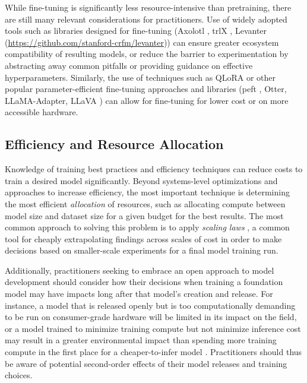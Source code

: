 While fine-tuning is significantly less resource-intensive than pretraining, there are still many relevant considerations for practitioners. Use of widely adopted tools such as libraries designed for fine-tuning (Axolotl \citep{axolotl}, trlX \citep{trlx-library}, Levanter (\url{https://github.com/stanford-crfm/levanter})) can ensure greater ecosystem compatibility of resulting models, or reduce the barrier to experimentation by abstracting away common pitfalls or providing guidance on effective hyperparameters. Similarly, the use of techniques such as QLoRA \citep{dettmers2023qlora} or other popular parameter-efficient fine-tuning approaches and libraries (peft \citep{peft} , Otter, LLaMA-Adapter, LLaVA \citep{li2023otter, zhang2023llamaadapter, liu2023improved}) can allow for fine-tuning for lower cost or on more accessible hardware.

\subsection{Efficiency and Resource Allocation}\label{sec:efficiency-training}

Knowledge of training best practices and efficiency techniques can reduce costs to train a desired model significantly. Beyond systems-level optimizations and approaches to increase efficiency, the most important technique is determining the most efficient \textit{allocation} of resources, such as allocating compute between model size and dataset size for a given budget for the best results. The most common approach to solving this problem is to apply \textit{scaling laws} \citep{kaplan2020scaling, hoffmann2022training, muennighoff2023scaling}, a common tool for cheaply extrapolating findings across scales of cost in order to make decisions based on smaller-scale experiments for a final model training run.

Additionally, practitioners seeking to embrace an open approach to model development should consider how their decisions when training a foundation model may have impacts long after that model's creation and release. For instance, a model that is released openly but is too computationally demanding to be run on consumer-grade hardware will be limited in its impact on the field, or a model trained to minimize training compute but not minimize inference cost may result in a greater environmental impact than spending more training compute in the first place for a cheaper-to-infer model \citep{hoffmann2022training, touvron2023llama}. Practitioners should thus be aware of potential second-order effects of their model releases and training choices.

